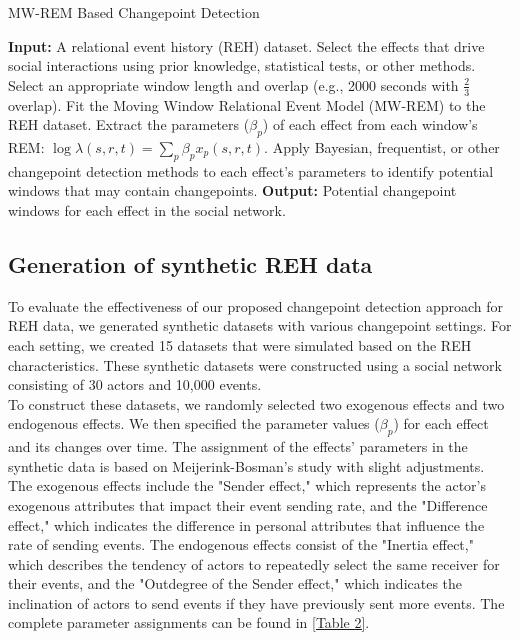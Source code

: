 \documentclass[]{interact}
\theoremstyle{plain}%
\theoremstyle{definition}
\theoremstyle{remark}
\begin{document}
{	\begin{algorithm}[H]
		\caption{MW-REM Based Changepoint Detection}\label{Algorithm1}
		\begin{algorithmic}[1]
			\State \textbf{Input:} A relational event history (REH) dataset.
			\State Select the effects that drive social interactions using prior knowledge, statistical tests, or other methods.
			\State Select an appropriate window length and overlap (e.g., 2000 seconds with $\frac{2}{3}$ overlap).
			\State Fit the Moving Window Relational Event Model (MW-REM) to the REH dataset.
			\State Extract the parameters ($\beta_p$) of each effect from each window's REM: $\log \lambda(s,r,t) = \sum_{p} \beta_p x_p(s,r,t)$.
			\State Apply Bayesian, frequentist, or other changepoint detection methods to each effect's parameters to identify potential windows that may contain changepoints.
			\State \textbf{Output:} Potential changepoint windows for each effect in the social network.
		\end{algorithmic}
	\end{algorithm}

	\subsection{Generation of synthetic REH data}
	
	\hspace{0.2cm} To evaluate the effectiveness of our proposed changepoint detection approach for REH data, we generated synthetic datasets with various changepoint settings. For each setting, we created 15 datasets that were simulated based on the REH characteristics. These synthetic datasets were constructed using a social network consisting of 30 actors and 10,000 events.\\
	
	To construct these datasets, we randomly selected two exogenous effects and two endogenous effects. We then specified the parameter values ($\beta_p$) for each effect and its changes over time. The assignment of the effects' parameters in the synthetic data is based on Meijerink-Bosman's study\cite{meijerink-bosmanDiscoveringTrendsSocial2022} with slight adjustments. The exogenous effects include the "Sender effect," which represents the actor's exogenous attributes that impact their event sending rate, and the "Difference effect," which indicates the difference in personal attributes that influence the rate of sending events. The endogenous effects consist of the "Inertia effect," which describes the tendency of actors to repeatedly select the same receiver for their events, and the "Outdegree of the Sender effect," which indicates the inclination of actors to send events if they have previously sent more events. 
	The complete parameter assignments can be found in \autoref{Table 2}. \\
	
}
\end{document}
